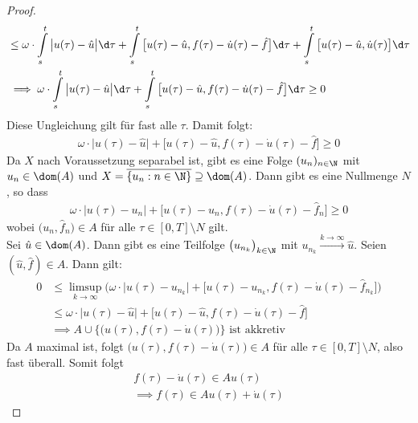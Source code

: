 \begin{proof}
\begin{align*}
&\leq\omega\cdot\int\limits_s^t\big| u(\tau)-\hat{u}\big|\d\tau+\int\limits_s^t\big[u(\tau)-\hat{u},f(\tau)-\dot{u}(\tau)-\hat{f}\big]\d\tau
+\int\limits_s^t\big[u(\tau)-\hat{u},\dot{u}(\tau)\big]\d\tau\\
&\implies
\omega\cdot\int\limits_s^t\big|u(\tau)-\hat{u}\big|\d\tau+\int\limits_s^t\big[u(\tau)-\hat{u},f(\tau)-\dot{u}(\tau)-\hat{f}\big]\d\tau\geq0
\end{align*}
Diese Ungleichung gilt für fast alle $\tau$. Damit folgt:
\begin{align*}
\omega\cdot\big|u(\tau)-\hat{u}\big|+\big[u(\tau)-\hat{u},f(\tau)-\dot{u}(\tau)-\hat{f}\big]\geq0
\end{align*}
Da $X$ nach Voraussetzung separabel ist, gibt es eine Folge $(u_n)_{n\in\N}$ mit $u_n\in\dom(A)$ und $X=\overline{\lbrace u_n:n\in\N\rbrace}\supseteq\dom(A)$. Dann gibt es eine Nullmenge $N$, so dass
\begin{align*}
\omega\cdot\big|u(\tau)-u_n\big|+\big[u(\tau)-u_n,f(\tau)-\dot{u}(\tau)-\hat{f}_n\big]\geq0 
\end{align*}
wobei $\big(u_n,\hat{f}_n\big)\in A$ für alle $\tau\in[0,T]\setminus N$ gilt.\\
Sei $\hat{u}\in\dom(A)$. Dann gibt es eine Teilfolge $\big(u_{n_k}\big)_{k\in\N}$ mit $u_{n_k}\stackrel{k\to\infty}{\longrightarrow}\hat{u}$. Seien $(\hat{u},\hat{f})\in A$. Dann gilt:
\begin{align*}
0&\leq\limsup\limits_{k\to\infty}\Big(\omega\cdot\big|u(\tau)-u_{n_k}\big|+\big[u(\tau)-u_{n_k},f(\tau)-\dot{u}(\tau)-\hat{f}_{n_k}\big]\Big)\\
&\leq\omega\cdot\big|u(\tau)-\hat{u}\big|+\big[u(\tau)-\hat{u},f(\tau)-\dot{u}(\tau)-\hat{f}\big]\\
&\implies
A\cup\Big\lbrace\big(u(\tau),f(\tau)-\dot{u}(\tau)\big)\Big\rbrace\text{ ist akkretiv}
\end{align*}
Da $A$ maximal ist, folgt $\big(u(\tau),f(\tau)-\dot{u}(\tau)\big)\in A$ für alle $\tau\in[0,T]\setminus N$, also fast überall. Somit folgt
\begin{align*}
f(\tau)-\dot{u}(\tau)\in A u(\tau)\\
\implies f(\tau)\in A u(\tau)+\dot{u}(\tau)
\end{align*}
\end{proof}

